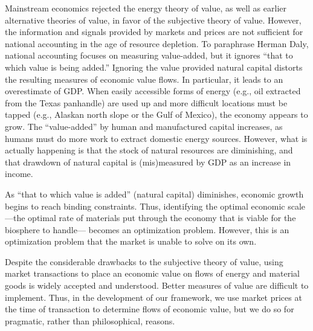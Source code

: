 Mainstream economics rejected the energy theory of value,
as well as earlier alternative theories of value,
in favor of the subjective theory of value. However, 
the information and signals provided by markets and prices 
are not sufficient for national accounting in
the age of resource depletion. To paraphrase
Herman Daly, 
national accounting  focuses on measuring value-added, 
but it ignores ``that to which value is being added.'' \cite[p. 453]{Daly1995}
Ignoring the value provided natural capital
 distorts the resulting measures of economic value flows.
In particular, it leads to an overestimate of GDP. 
When easily accessible forms of energy 
(e.g., oil extracted from the Texas panhandle) 
are used up and more difficult locations must be tapped 
(e.g., Alaskan north slope or the Gulf of Mexico), 
the economy appears to grow.
The ``value-added'' by human and manufactured capital increases, 
as humans must do more work to extract domestic energy sources. 
However, what is actually happening is that the stock 
of natural resources are diminishing, 
and that drawdown of natural capital is (mis)measured by GDP as 
an increase in income.\cite[pp.~66~and~75]{Daly1997}

As ``that to which value is added'' (natural capital) diminishes, 
economic growth begins to reach binding constraints. 
Thus, identifying the optimal economic 
scale---the optimal rate of materials put through the economy that 
is viable for the biosphere to handle--- becomes an optimization problem. 
However, this is an optimization 
problem that the market is unable to solve on its own. 

%
Despite the considerable drawbacks to the subjective theory of value, 
using market transactions to place an economic value
on flows of energy and material goods is widely accepted and understood.
Better measures of value are difficult to implement. 
Thus, in the development of our framework, we use market prices at the time of transaction to determine flows of economic value, but 
we do so for pragmatic, rather than philosophical, reasons.

